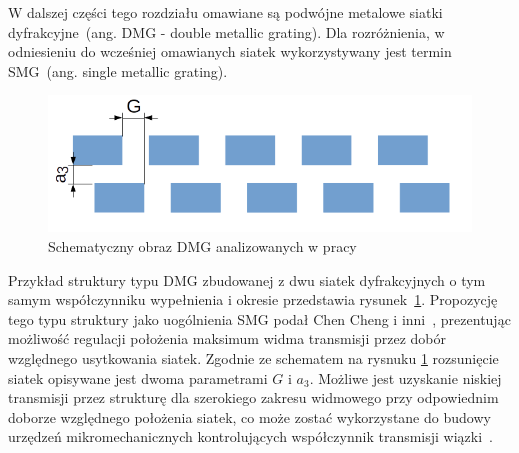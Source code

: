 W dalszej części tego rozdziału omawiane są podwójne metalowe siatki dyfrakcyjne~(ang. DMG - double metallic grating). Dla rozróżnienia, w odniesieniu do wcześniej omawianych siatek wykorzystywany jest termin SMG~(ang. single metallic grating).

\begin{figure}[tb]
	\includegraphics[width=\textwidth]{images/dmg/dmg_general_schem.png}
	\caption{Schematyczny obraz DMG analizowanych w pracy \cite{cheng2007controllable}}
	\label{fig:cheng_dmg_schem}
\end{figure}

Przykład struktury typu DMG zbudowanej z dwu siatek dyfrakcyjnych o tym samym współczynniku wypełnienia i okresie przedstawia rysunek~\ref{fig:cheng_dmg_schem}. Propozycję tego typu struktury jako uogólnienia SMG podał Chen Cheng i inni~\cite{cheng2007controllable}, prezentując możliwość regulacji położenia maksimum widma transmisji przez dobór względnego usytkowania siatek. Zgodnie ze schematem na rysnuku \ref{fig:cheng_dmg_schem} rozsunięcie siatek opisywane jest dwoma parametrami $G$ i $a_3$. Możliwe jest uzyskanie niskiej transmisji przez strukturę dla szerokiego zakresu widmowego przy odpowiednim doborze względnego położenia siatek, co może zostać wykorzystane do budowy urzędzeń mikromechanicznych kontrolujących współczynnik transmisji wiązki~\cite{cheng2007controllable}.

